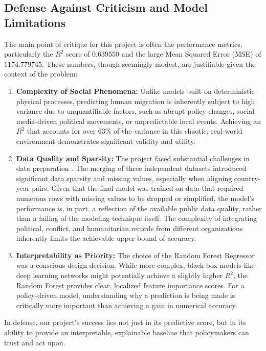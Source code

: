 \documentclass{article}
\theoremstyle{plain}
\theoremstyle{definition}
\theoremstyle{remark}
\begin{document}
\subsection{Defense Against Criticism and Model Limitations}

The main point of critique for this project is often the performance metrics, particularly the $R^2$ score of $0.639550$ and the large Mean Squared Error (MSE) of $1174.779745$. These numbers, though seemingly modest, are justifiable given the context of the problem:

\begin{enumerate}
    \item \textbf{Complexity of Social Phenomena:} Unlike models built on deterministic physical processes, predicting human migration is inherently subject to high variance due to unquantifiable factors, such as abrupt policy changes, social media-driven political movements, or unpredictable local events. Achieving an $R^2$ that accounts for over $63\%$ of the variance in this chaotic, real-world environment demonstrates significant validity and utility.
    \item \textbf{Data Quality and Sparsity:} The project faced substantial challenges in data preparation . The merging of three independent datasets introduced significant data sparsity and missing values, especially when aligning country-year pairs. Given that the final model was trained on data that required numerous rows with missing values to be dropped or simplified, the model's performance is, in part, a reflection of the available public data quality, rather than a failing of the modeling technique itself. The complexity of integrating political, conflict, and humanitarian records from different organizations inherently limits the achievable upper bound of accuracy.
    \item \textbf{Interpretability as Priority:} The choice of the Random Forest Regressor was a conscious design decision. While more complex, black-box models like deep learning networks might potentially achieve a slightly higher $R^2$, the Random Forest provides clear, localized feature importance scores. For a policy-driven model, understanding why a prediction is being made is critically more important than achieving a gain in numerical accuracy.
\end{enumerate}

In defense, our project's success lies not just in its predictive score, but in its ability to provide an interpretable, explainable baseline that policymakers can trust and act upon.
\end{document}
